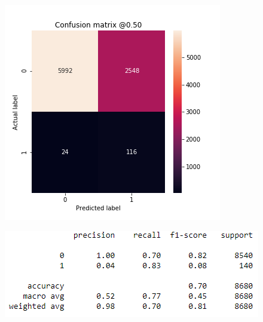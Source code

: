 \documentclass[proposal]{softeng}
\begin{document}
\begin{figure}[h!]
\centering
\begin{minipage}[t]{.4\textwidth}
  \centering
  \includegraphics[width=\textwidth]{images/building_ann/confusion_matrix_weighted.png}
  \label{fig:confusion_matrix_weighted}
\end{minipage}
\begin{minipage}[t]{.5\textwidth}
  \centering
  \includegraphics[width=\textwidth]{images/building_ann/classification_report_weighted.png}
  \label{fig:classification_report_weighted}
  \end{minipage}
\end{figure}



\newpage
\footnotesize




\clearpage
\end{document}

